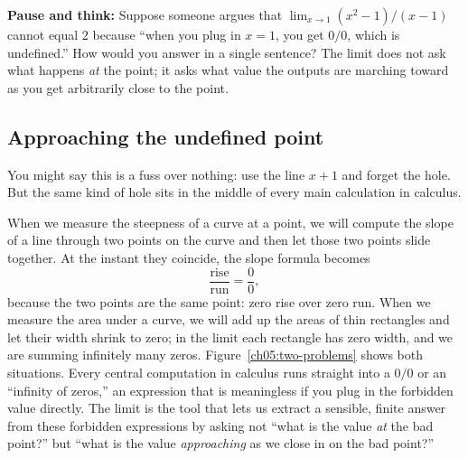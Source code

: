 \begin{recoverybox}
\textbf{Pause and think:} Suppose someone argues that $\lim_{x\to 1} (x^2-1)/(x-1)$ cannot equal $2$
because ``when you plug in $x=1$, you get $0/0$, which is undefined.'' How would you answer in a single
sentence? The limit does not ask what happens \emph{at} the point; it asks what value the outputs are
marching toward as you get arbitrarily close to the point.
\end{recoverybox}

\subsection{Approaching the undefined point}

You might say this is a fuss over nothing: use the line $x+1$ and forget the hole. But the
same kind of hole sits in the middle of every main calculation in calculus.

When we measure the steepness of a curve at a point, we will compute the slope of a line
through two points on the curve and then let those two points slide together. At the instant
they coincide, the slope formula becomes
\[
  \frac{\text{rise}}{\text{run}} = \frac{0}{0},
\]
because the two points are the same point: zero rise over zero run. When we measure the area
under a curve, we will add up the areas of thin rectangles and let their width shrink to zero;
in the limit each rectangle has zero width, and we are summing infinitely many zeros.
Figure~\ref{ch05:two-problems} shows both situations. Every
central computation in calculus runs straight into a $0/0$ or an ``infinity of zeros,'' an
expression that is meaningless if you plug in the forbidden value directly. The limit is the
tool that lets us extract a sensible, finite answer from these forbidden expressions by asking
not ``what is the value \emph{at} the bad point?'' but ``what is the value \emph{approaching} as
we close in on the bad point?''

